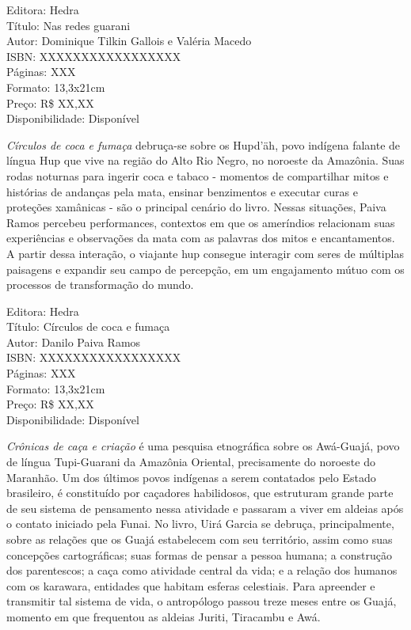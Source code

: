 \begin{ficha}
Editora: Hedra\\
Título: Nas redes guarani\\
Autor: Dominique Tilkin Gallois e Valéria Macedo\\ 
ISBN: XXXXXXXXXXXXXXXXX\\
Páginas: XXX\\
Formato: 13,3x21cm\\
Preço: R\$ XX,XX\\
Disponibilidade: Disponível
\end{ficha}

\pagebreak


\noindent{}\textit{Círculos de coca e fumaça} debruça-se sobre os Hupd’äh, povo indígena falante de língua Hup que vive na região do Alto Rio Negro, no noroeste da Amazônia. Suas rodas noturnas para ingerir coca e tabaco - momentos de compartilhar mitos e histórias de andanças pela mata, ensinar benzimentos e executar curas e proteções xamânicas - são o principal cenário do livro. Nessas situações, Paiva Ramos percebeu performances, contextos em que os ameríndios relacionam suas experiências e observações da mata com as palavras dos mitos e encantamentos. A partir dessa interação, o viajante hup consegue interagir com seres de múltiplas paisagens e expandir seu campo de percepção, em um engajamento mútuo com os processos de transformação do mundo.

\begin{ficha}
Editora: Hedra\\
Título: Círculos de coca e fumaça\\
Autor:  Danilo Paiva Ramos\\ 
ISBN: XXXXXXXXXXXXXXXXX\\
Páginas: XXX\\
Formato: 13,3x21cm\\
Preço: R\$ XX,XX\\
Disponibilidade: Disponível
\end{ficha}

\pagebreak


\noindent{}\textit{Crônicas de caça e criação} é uma pesquisa etnográfica sobre os Awá-Guajá, povo de língua Tupi-Guarani da Amazônia Oriental, precisamente do noroeste do Maranhão. Um dos últimos povos indígenas a serem contatados pelo Estado brasileiro, é constituído por caçadores habilidosos, que estruturam grande parte de seu sistema de pensamento nessa atividade e passaram a viver em aldeias após o contato iniciado pela Funai. No livro, Uirá Garcia se debruça, principalmente, sobre as relações que os Guajá estabelecem com seu território, assim como suas concepções cartográficas; suas formas de pensar a pessoa humana; a construção dos parentescos; a caça como atividade central da vida; e a relação dos humanos com os karawara, entidades que habitam esferas celestiais. Para apreender e transmitir tal sistema de vida, o antropólogo passou treze meses entre os Guajá, momento em que frequentou as aldeias Juriti, Tiracambu e Awá.

